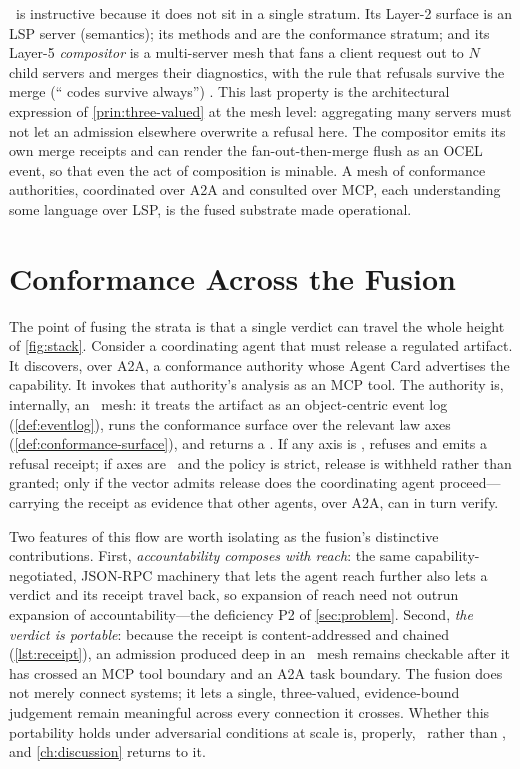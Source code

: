 \lspmax\ is instructive because it does not sit in a single stratum. Its Layer-2
surface is an LSP server (semantics); its \maxm{*} methods and 
are the conformance stratum; and its Layer-5 \emph{compositor} is a multi-server
mesh that fans a client request out to $N$ child servers and merges their
diagnostics, with the rule that refusals survive the merge
(`` codes survive always'') \citep{lspmax}. This last
property is the architectural expression of \cref{prin:three-valued} at the mesh
level: aggregating many servers must not let an admission elsewhere overwrite a
refusal here. The compositor emits its own merge receipts and can render the
fan-out-then-merge flush as an OCEL event, so that even the act of composition is
minable. A mesh of conformance authorities, coordinated over A2A and consulted
over MCP, each understanding some language over LSP, is the fused substrate made
operational.

\section{Conformance Across the Fusion}
\label{sec:fus-conformance}

The point of fusing the strata is that a single verdict can travel the whole
height of \cref{fig:stack}. Consider a coordinating agent that must release a
regulated artifact. It discovers, over A2A, a conformance authority whose Agent
Card advertises the capability. It invokes that authority's analysis as an MCP
tool. The authority is, internally, an \lspmax\ mesh: it treats the artifact as
an object-centric event log (\cref{def:eventlog}), runs the conformance surface
over the relevant law axes (\cref{def:conformance-surface}), and returns a
. If any axis is ,  refuses
and emits a refusal receipt; if axes are \unknownstat\ and the policy is strict,
release is withheld rather than granted; only if the vector admits release does
the coordinating agent proceed---carrying the receipt as evidence that other
agents, over A2A, can in turn verify.

Two features of this flow are worth isolating as the fusion's distinctive
contributions. First, \emph{accountability composes with reach}: the same
capability-negotiated, JSON-RPC machinery that lets the agent reach further also
lets a verdict and its receipt travel back, so expansion of reach need not
outrun expansion of accountability---the deficiency P2 of \cref{sec:problem}.
Second, \emph{the verdict is portable}: because the receipt is content-addressed
and chained (\cref{lst:receipt}), an admission produced deep in an \lspmax\ mesh
remains checkable after it has crossed an MCP tool boundary and an A2A task
boundary. The fusion does not merely connect systems; it lets a single,
three-valued, evidence-bound judgement remain meaningful across every connection
it crosses. Whether this portability holds under adversarial conditions at scale
is, properly, \candidate\ rather than \admitted, and \cref{ch:discussion} returns
to it.
